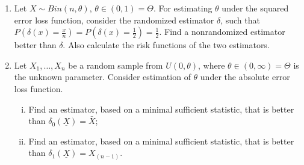 \documentclass[11pt]{article}
\begin{document}
\begin{enumerate}
    \item Let $X \sim Bin(n, \theta)$, $\theta \in (0, 1) = \Theta$. For estimating $\theta$ under the squared error loss function, consider the randomized estimator $\delta$, such that $P(\delta(x) = \frac{x}{n}) = P(\delta(x) = \frac{1}{2}) = \frac{1}{2}$. Find a nonrandomized estimator better than $\delta$. Also calculate the risk functions of the two estimators.

    \item Let $X_{1}, \dots, X_{n}$ be a random sample from $U(0, \theta)$, where $\theta \in (0, \infty) = \Theta$ is the unknown parameter. Consider estimation of $\theta$ under the absolute error loss function.
    \begin{enumerate}[(i)]
        \item Find an estimator, based on a minimal sufficient statistic, that is better than $\delta_{0}(\underline{X}) = \bar{X}$;
        \item Find an estimator, based on a minimal sufficient statistic, that is better than $\delta_{1}(\underline{X}) = X_{(n-1)}$.
    \end{enumerate}
\end{enumerate}
\end{document}
